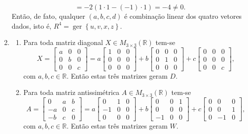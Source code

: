 \documentclass[12pt,a4paper]{article}
\newcommand*\ger[1]{\operatorname{ger}\left\{#1\right\}}
\newcommand*\R{\mathbb{R}}
\begin{document}
\begin{enumerate}
\[= -2(1 \cdot 1 - (-1) \cdot 1)
=-4 \neq 0.
\]
Então, de fato, qualquer $(a,b,c,d)$ é combinação linear dos quatro vetores dados, isto é, $R^4 = \ger{u,v,x,z}$.
\item
\begin{enumerate}
\item Para toda matriz diagonal $X \in M_{3 \times 3}(\R)$ tem-se
\[
X
= \begin{bmatrix}
a & 0 & 0 \\
0 & b & 0 \\
0 & 0 & c
\end{bmatrix}
=
a
\begin{bmatrix}
1 & 0 & 0 \\
0 & 0 & 0 \\
0 & 0 & 0
\end{bmatrix}
+b
\begin{bmatrix}
0 & 0 & 0 \\
0 & 1 & 0 \\
0 & 0 & 0
\end{bmatrix}
+c
\begin{bmatrix}
0 & 0 & 0 \\
0 & 0 & 0 \\
0 & 0 & c
\end{bmatrix},
\]
com $a,b,c \in \R$. Então estas três matrizes geram $D$.

\item Para toda matriz antissimétrica $A \in M_{3 \times 3}(\R)$ tem-se
\[
A
= \begin{bmatrix}
 0 & a & b \\
-a & 0 & c \\
-b & c & 0
\end{bmatrix}
=
a
\begin{bmatrix}
 0 & 1 & 0 \\
-1 & 0 & 0 \\
 0 & 0 & 0
\end{bmatrix}
+b
\begin{bmatrix}
 0 & 0 & 1 \\
 0 & 0 & 0 \\
-1 & 0 & 0
\end{bmatrix}
+c
\begin{bmatrix}
0 &  0 & 0 \\
0 &  0 & 1 \\
0 & -1 & 0
\end{bmatrix},
\]
com $a,b,c \in \R$. Então estas três matrizes geram $W$.


\end{enumerate}
\end{enumerate}
\end{document}
